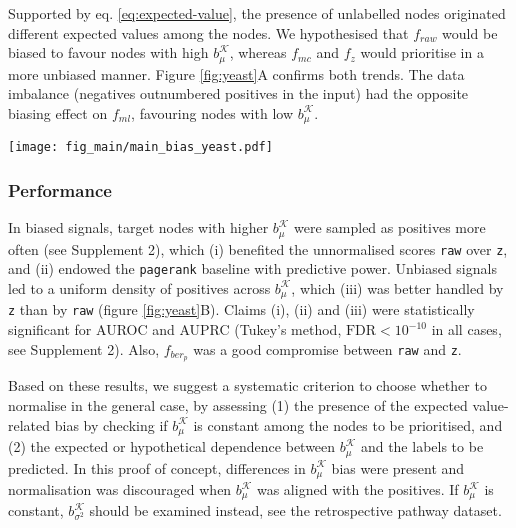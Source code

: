 \documentclass[final]{bioinfo}
\newcommand{\method}{\texttt}
\newcommand{\ebias}{b_{\mu}^{\mathcal{K}}}
\newcommand{\vbias}{b_{\sigma^2}^{\mathcal{K}}}
\begin{document}
Supported by eq. \ref{eq:expected-value}, the presence of unlabelled nodes originated different expected values among the nodes. 
We hypothesised that $f_{raw}$ would be biased to favour nodes with high $\ebias$, whereas $f_{mc}$ and $f_z$ would prioritise in a more unbiased manner. 
Figure \ref{fig:yeast}A confirms both trends. 
The data imbalance (negatives outnumbered positives in the input) had the opposite biasing effect on $f_{ml}$, favouring nodes with low $\ebias$.

\begin{figure*}[!tpb]%
\centerline{
\texttt{[image: fig\_main/main\_bias\_yeast.pdf]}
}
\caption{Analysis of biased and unbiased synthetic signals on the yeast network. 
Nodes showed a mean value-related bias, see Supplement 2.
\textbf{(A)} Effects of the mean value bias in on the average node ranking, under biased and unbiased signals. 
Lines correspond to Generalised Additive Models with $y \sim s(x, bs = "cs")$ and 0.95 confidence intervals.
\method{raw} and \method{ml} tended to find positives with high and low $\ebias$,  respectively. 
\method{z} found positives in a more uniform manner.
\textbf{(B)} Performance in terms of AUROC and AUPRC.
\method{raw} was better suited for biased signals, for which the \method{pagerank} baseline also outperformed a random predictor. 
Conversely, \method{z} worked best on unbiased signals. 
}
\label{fig:yeast}
\end{figure*}

\subsubsection*{Performance}

In biased signals, target nodes with higher $\ebias$ were sampled as positives more often (see Supplement 2), which (i) benefited the unnormalised scores \method{raw} over \method{z}, and (ii) endowed the \method{pagerank} baseline with predictive power.
Unbiased signals led to a uniform density of positives across $\ebias$, which (iii) was better handled by \method{z} than by \method{raw} (figure \ref{fig:yeast}B). 
Claims (i), (ii) and (iii) were statistically significant for AUROC and AUPRC (Tukey's method, $\textrm{FDR}<10^{-10}$ in all cases, see Supplement 2).
Also, $f_{ber_p}$ was a good compromise between \method{raw} and \method{z}.

Based on these results, we suggest a systematic criterion to choose whether to normalise in the general case, by assessing (1) the presence of the expected value-related bias by checking if $\ebias$ is constant among the nodes to be prioritised, and (2) the expected or hypothetical dependence between $\ebias$ and the labels to be predicted. 
In this proof of concept, differences in $\ebias$ bias were present and normalisation was discouraged when $\ebias$ was aligned with the positives.
If $\ebias$ is constant, $\vbias$ should be examined instead, see the retrospective pathway dataset. 
\end{document}
